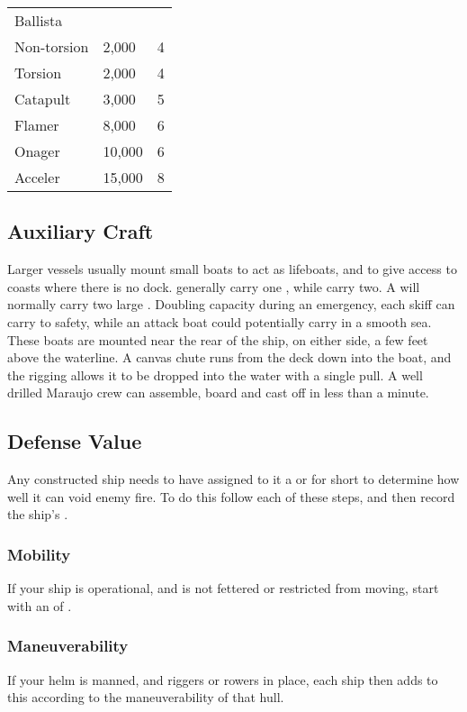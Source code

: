 \begin{multicols*}{2}
\begin{multicols*}{2}
\begin{normbox}
\begin{tabular}{@{} l l l}
\midrule
Ballista &  & \\
\quad Non-torsion  & 2,000 & 4\\
\quad Torsion & 2,000 & 4\\
Catapult & 3,000 & 5\\
Flamer & 8,000 & 6\\
Onager & 10,000 & 6\\
Acceler & 15,000 & 8\\
\end{tabular}
\end{normbox}
\end{multicols*}

\subsection{Auxiliary Craft}
Larger vessels usually mount small boats to act as lifeboats, and to give access to coasts where there is no dock.  generally carry one , while  carry two. A  will normally carry two large . Doubling capacity during an emergency, each skiff can carry  to safety, while an attack boat could potentially carry  in a smooth sea. These boats are mounted near the rear of the ship, on either side, a few feet above the waterline. A canvas chute runs from the deck down into the boat, and the rigging allows it to be dropped into the water with a single pull. A well drilled Maraujo crew can assemble, board and cast off in less than a minute.
\subsection{Defense Value}
Any constructed ship needs to have assigned to it a  or \ADV for short to determine how well it can void enemy fire. To do this follow each of these steps, and then record the ship's \ADV.
\subsubsection{Mobility}
If your ship is operational, and is not fettered or restricted from moving, start with an \ADV of .
\subsubsection{Maneuverability}
If your helm is manned, and riggers or rowers in place, each ship then adds to this \ADV according to the maneuverability of that hull.


\end{multicols*}
